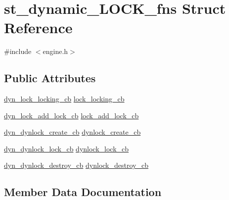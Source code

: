 \hypertarget{structst__dynamic___l_o_c_k__fns}{}\section{st\+\_\+dynamic\+\_\+\+L\+O\+C\+K\+\_\+fns Struct Reference}
\label{structst__dynamic___l_o_c_k__fns}


{\ttfamily \#include $<$engine.\+h$>$}

\subsection*{Public Attributes}
\begin{DoxyCompactItemize}
\item 
\hyperlink{engine_8h_a13c38e44eaca5d817a3e7cf0ddfafc88}{dyn\+\_\+lock\+\_\+locking\+\_\+cb} \hyperlink{structst__dynamic___l_o_c_k__fns_a495ddb05b36eee18ce44ed977c6f6d8d}{lock\+\_\+locking\+\_\+cb}
\item 
\hyperlink{engine_8h_a61e818120dba69e5c9b701526ab89910}{dyn\+\_\+lock\+\_\+add\+\_\+lock\+\_\+cb} \hyperlink{structst__dynamic___l_o_c_k__fns_aa7178025f352542e04bb37fd3be59396}{lock\+\_\+add\+\_\+lock\+\_\+cb}
\item 
\hyperlink{engine_8h_a15257fbbeb396254a896ba607f6d0814}{dyn\+\_\+dynlock\+\_\+create\+\_\+cb} \hyperlink{structst__dynamic___l_o_c_k__fns_ad4ec885da11188275dd9e34ef4fe3823}{dynlock\+\_\+create\+\_\+cb}
\item 
\hyperlink{engine_8h_a4f3cec5ef8f9661671c3ff8c6da63610}{dyn\+\_\+dynlock\+\_\+lock\+\_\+cb} \hyperlink{structst__dynamic___l_o_c_k__fns_a71056a41e6dd1c75eb00ea605bb4945a}{dynlock\+\_\+lock\+\_\+cb}
\item 
\hyperlink{engine_8h_aca2ea629691acfe8e5d248a1604f65b1}{dyn\+\_\+dynlock\+\_\+destroy\+\_\+cb} \hyperlink{structst__dynamic___l_o_c_k__fns_a2a6856844c40ccbb931117bbf775f306}{dynlock\+\_\+destroy\+\_\+cb}
\end{DoxyCompactItemize}


\subsection{Member Data Documentation}
